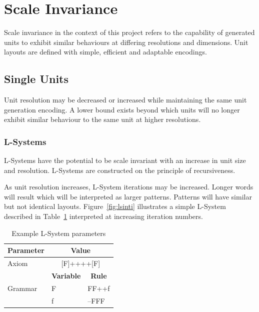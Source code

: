 \section{Scale Invariance}

Scale invariance in the context of this project refers to the capability of generated units to exhibit similar behaviours at differing resolutions and dimensions. Unit layouts are defined with simple, efficient and adaptable encodings.

\subsection{Single Units}

Unit resolution may be decreased or increased while maintaining the same unit generation encoding. A lower bound exists beyond which units will no longer exhibit similar behaviour to the same unit at higher resolutions.

\subsubsection{L-Systems}

L-Systems have the potential to be scale invariant with an increase in unit size and resolution. L-Systems are constructed on the principle of recursiveness.

As unit resolution increases, L-System iterations may be increased. Longer words will result which will be interpreted as larger patterns. Patterns will have similar but not identical layouts. Figure~\ref{fig:lsinti} illustrates a simple L-System described in Table~\ref{tab:exlspar} interpreted at increasing iteration numbers.

\begin{table}[H]
\centering
\caption{Example L-System parameters}
\label{tab:exlspar}
\begin{tabular}{@{}lcl@{}}
\toprule
\multicolumn{1}{c}{\textbf{Parameter}} & \multicolumn{2}{c}{\textbf{Value}}                        \\ \midrule
Axiom                                  & \multicolumn{2}{c}{{[}F{]}++++{[}F{]}}                    \\ \cmidrule(l){2-3} 
\multirow{3}{*}{Grammar}               & \textbf{Variable}     & \multicolumn{1}{c}{\textbf{Rule}} \\ \cmidrule(l){2-3} 
                                       & \multicolumn{1}{l}{F} & FF++f                             \\
                                       & \multicolumn{1}{l}{f} & --FFF                             \\ \bottomrule
\end{tabular}
\end{table}

